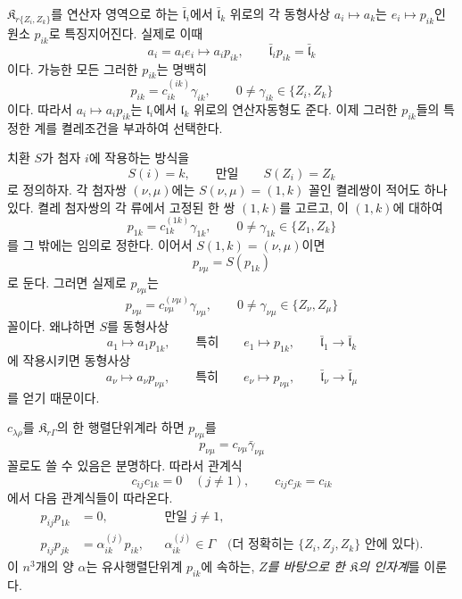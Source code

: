 \(\mathfrak K_{r\{Z_i,Z_k\}}\)를 연산자 영역으로 하는 \(\bar{\mathfrak l}_i\)에서 \(\bar{\mathfrak l}_k\) 위로의 각 동형사상 \(a_i\mapsto a_k\)는 \(e_i\mapsto p_{ik}\)인 원소 \(p_{ik}\)로 특징지어진다. 실제로 이때
\[
        a_i=a_ie_i\longmapsto a_ip_{ik},
        \qquad
        \bar{\mathfrak l}_i p_{ik}=\bar{\mathfrak l}_k
\]
이다. 가능한 모든 그러한 \(p_{ik}\)는 명백히
\[
        p_{ik}=c_{ik}^{(ik)}\gamma_{ik},
        \qquad
        0\ne\gamma_{ik}\in\{Z_i,Z_k\}
\]
이다. 따라서 \(a_i\mapsto a_ip_{ik}\)는 \(\mathfrak l_i\)에서 \(\mathfrak l_k\) 위로의 연산자동형도 준다. 이제 그러한 \(p_{ik}\)들의 특정한 계를 켤레조건을 부과하여 선택한다.

치환 \(S\)가 첨자 \(i\)에 작용하는 방식을
\[
        S(i)=k,
        \qquad\text{만일}\qquad
        S(Z_i)=Z_k
\]
로 정의하자. 각 첨자쌍 \((\nu,\mu)\)에는 \(S(\nu,\mu)=(1,k)\) 꼴인 켤레쌍이 적어도 하나 있다. 켤레 첨자쌍의 각 류에서 고정된 한 쌍 \((1,k)\)를 고르고, 이 \((1,k)\)에 대하여
\[
        p_{1k}=c_{1k}^{(1k)}\gamma_{1k},
        \qquad
        0\ne\gamma_{1k}\in\{Z_1,Z_k\}
\]
를 그 밖에는 임의로 정한다. 이어서 \(S(1,k)=(\nu,\mu)\)이면
\[
        p_{\nu\mu}=S(p_{1k})
\]
로 둔다. 그러면 실제로 \(p_{\nu\mu}\)는
\[
        p_{\nu\mu}
        =c_{\nu\mu}^{(\nu\mu)}\gamma_{\nu\mu},
        \qquad
        0\ne\gamma_{\nu\mu}
        \in\{Z_\nu,Z_\mu\}
\]
꼴이다. 왜냐하면 \(S\)를 동형사상
\[
        a_1\longmapsto a_1p_{1k},
        \qquad\text{특히}\qquad
        e_1\longmapsto p_{1k},
        \qquad
        \bar{\mathfrak l}_1\longrightarrow
        \bar{\mathfrak l}_k
\]
에 작용시키면 동형사상
\[
        a_\nu\longmapsto a_\nu p_{\nu\mu},
        \qquad\text{특히}\qquad
        e_\nu\longmapsto p_{\nu\mu},
        \qquad
        \bar{\mathfrak l}_\nu\longrightarrow
        \bar{\mathfrak l}_\mu
\]
를 얻기 때문이다.

\(c_{\lambda\rho}\)를 \(\mathfrak K_{r\Gamma}\)의 한 행렬단위계라 하면 \(p_{\nu\mu}\)를
\[
        p_{\nu\mu}=c_{\nu\mu}\bar\gamma_{\nu\mu}
\]
꼴로도 쓸 수 있음은 분명하다. 따라서 관계식
\[
        c_{ij}c_{1k}=0\quad(j\ne1),
        \qquad
        c_{ij}c_{jk}=c_{ik}
\]
에서 다음 관계식들이 따라온다.
\[
\begin{aligned}
p_{ij}p_{1k}&=0,
   &&\text{만일 }j\ne1,\\
p_{ij}p_{jk}&=\alpha_{ik}^{(j)}p_{ik},
   &&\alpha_{ik}^{(j)}\in\Gamma
     \quad\text{(더 정확히는 }\{Z_i,Z_j,Z_k\}\text{ 안에 있다).}
\end{aligned}
\]
이 \(n^3\)개의 양 \(\alpha\)는 유사행렬단위계 \(p_{ik}\)에 속하는, \emph{\(Z\)를 바탕으로 한 \(\mathfrak K\)의 인자계}를 이룬다.

